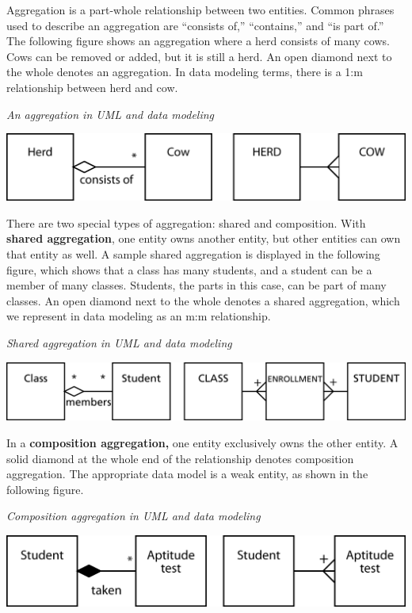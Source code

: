 \documentclass[
]{article}
\begin{document}
Aggregation is a part-whole relationship between two entities. Common
phrases used to describe an aggregation are ``consists of,'' ``contains,''
and ``is part of.'' The following figure shows an aggregation where a herd
consists of many cows. Cows can be removed or added, but it is still a
herd. An open diamond next to the whole denotes an aggregation. In data
modeling terms, there is a 1:m relationship between herd and cow.

\emph{An aggregation in UML and data modeling}

\includegraphics{Figures/Chapter 7/aggregate.png}

There are two special types of aggregation: shared and composition. With
\textbf{shared aggregation}, one entity owns another entity, but other
entities can own that entity as well. A sample shared aggregation is
displayed in the following figure, which shows that a class has many
students, and a student can be a member of many classes. Students, the
parts in this case, can be part of many classes. An open diamond next to
the whole denotes a shared aggregation, which we represent in data
modeling as an m:m relationship.

\emph{Shared aggregation in UML and data modeling}

\includegraphics{Figures/Chapter 7/sharedaggregate.png}

In a \textbf{composition aggregation,} one entity exclusively owns the other
entity. A solid diamond at the whole end of the relationship denotes
composition aggregation. The appropriate data model is a weak entity, as
shown in the following figure.

\emph{Composition aggregation in UML and data modeling}

\includegraphics{Figures/Chapter 7/compaggregate.png}
\end{document}
